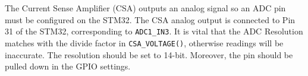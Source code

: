 The Current Sense Amplifier (CSA) outputs an analog signal so an ADC pin must be configured on the STM32. The CSA analog output is connected to Pin 31 of the STM32, corresponding to \verb|ADC1_IN3|.
It is vital that the ADC Resolution matches with the divide factor in \verb|CSA_VOLTAGE()|, otherwise readings will be inaccurate. The resolution should be set to 14-bit.
Moreover, the pin should be pulled down in the GPIO settings.